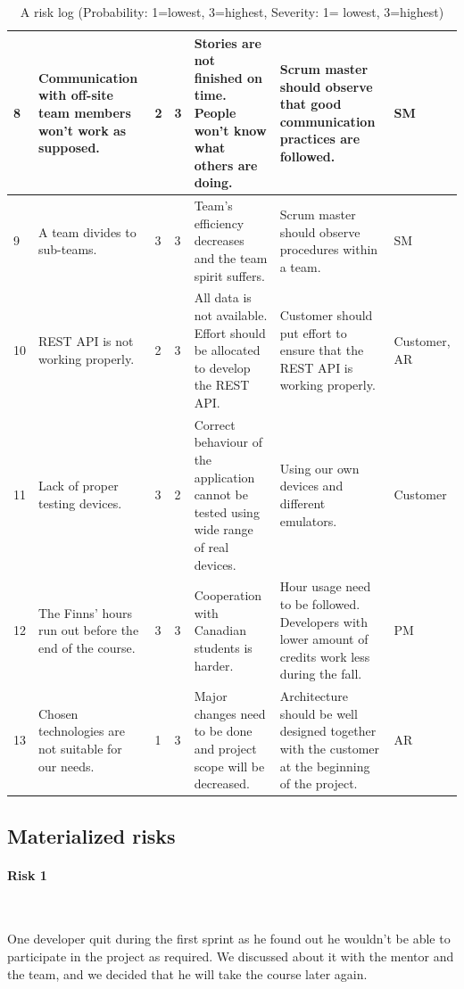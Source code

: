 \begin{table}[H]
{\begin{tabular}{|p{0.5cm}|p{3cm}|p{1cm}|p{1cm}|p{4cm}|p{4cm}|p{1.5cm}|}
8 &
Communication with off-site team members won't work as supposed. &
2 &
3 &
Stories are not finished on time. People won't know what others are doing. &
Scrum master should observe that good communication practices are followed. &
SM \\
\hline

9 &
A team divides to sub-teams. &
3 &
3 &
Team's efficiency decreases and the team spirit suffers. &
Scrum master should observe procedures within a team. &
SM \\
\hline

10 &
REST API is not working properly. &
2 &
3 &
All data is not available. Effort should be allocated to develop the REST API. &
Customer should put effort to ensure that the REST API is working properly.
& Customer, AR \\
\hline

11 &
Lack of proper testing devices. &
3 &
2 &
Correct behaviour of the application cannot be tested using wide range of real
devices.
& Using our own devices and different emulators. & 
Customer \\
\hline

12 &
The Finns' hours run out before the end of the course. &
3 &
3 &
Cooperation with Canadian students is harder. &
Hour usage need to be followed. Developers with lower amount of credits
work less during the fall. &
PM \\
\hline

13 &
Chosen technologies are not suitable for our needs. & 
1 &
3 &
Major changes need to be done and project scope will be decreased. &
Architecture should be well designed together with the customer at the
beginning of the project. &
AR \\
\hline


\end{tabular} 
}
\caption{A risk log (Probability: 1=lowest, 3=highest, Severity: 1= lowest, 
3=highest)}
\label{table:Risklog}
\end{table}

\subsection{Materialized risks}

\paragraph{Risk 1}~

One developer quit during the first sprint as he found out he wouldn't be able
to participate in the project as required. We discussed about it with the mentor
and the team, and we decided that he will take the course later again.

